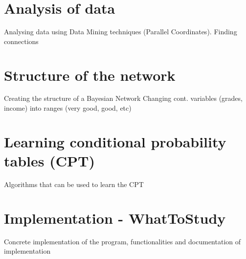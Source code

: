 \documentclass[%
	pdftex,
	oneside,        %
	11pt,           %
	parskip=half,   %
	headsepline,    %
	footsepline,    %
	abstracton,     %
	USenglish,      %
	a4paper,        %
]{report}
\begin{document}
\chapter{Analysis of data}
Analysing data using Data Mining techniques (Parallel Coordinates). Finding connections

\chapter{Structure of the network}
Creating the structure of a Bayesian Network
Changing cont. variables (grades, income) into ranges (very good, good, etc)

\chapter{Learning conditional probability tables (CPT)}
Algorithms that can be used to learn the CPT

\chapter{Implementation - WhatToStudy}
Concrete implementation of the program, functionalities and documentation of implementation

%

\lstlistoflistings
\printbibliography

\begin{appendices}

%

\end{appendices}
\end{document}
